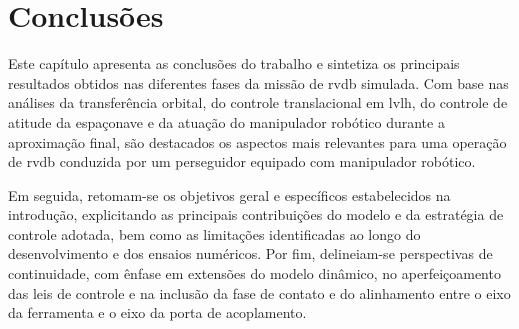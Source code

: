 \chapter{Conclusões}
\label{sec:cap5_conclusoes}

Este capítulo apresenta as conclusões do trabalho e sintetiza os principais resultados obtidos nas diferentes fases da missão de \gls{rvdb} simulada.
Com base nas análises da transferência orbital, do controle translacional em \gls{lvlh}, do controle de atitude da espaçonave e da atuação do manipulador robótico durante a aproximação final, são destacados os aspectos mais relevantes para uma operação de \gls{rvdb} conduzida por um perseguidor equipado com manipulador robótico.

Em seguida, retomam-se os objetivos geral e específicos estabelecidos na introdução, explicitando as principais contribuições do modelo e da estratégia de controle adotada, bem como as limitações identificadas ao longo do desenvolvimento e dos ensaios numéricos.
Por fim, delineiam-se perspectivas de continuidade, com ênfase em extensões do modelo dinâmico, no aperfeiçoamento das leis de controle e na inclusão da fase de contato e do alinhamento entre o eixo da ferramenta e o eixo da porta de acoplamento.





